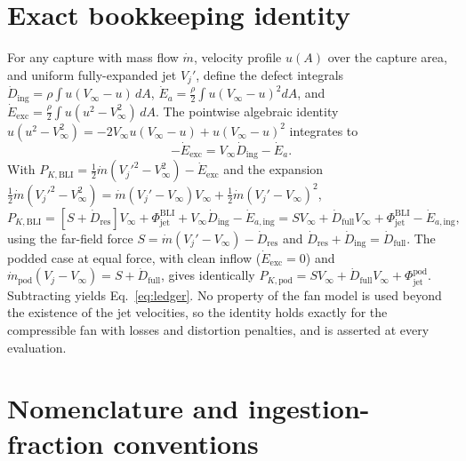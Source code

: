 \documentclass[10pt]{article}
\begin{document}
\appendix

\section{Exact bookkeeping identity}\label{app:identity}

For any capture with mass flow $\dot m$, velocity profile $u(A)$ over the
capture area, and uniform fully-expanded jet $V_j'$, define the defect
integrals
$\dot D_{\mathrm{ing}}=\rho\!\int u(V_\infty-u)\,dA$,
$\dot E_{a}=\tfrac{\rho}{2}\!\int u(V_\infty-u)^2 dA$, and
$\dot E_{\mathrm{exc}}=\tfrac{\rho}{2}\!\int u(u^2-V_\infty^2)\,dA$.
The pointwise algebraic identity
$u(u^2-V_\infty^2) = -2V_\infty u(V_\infty-u) + u(V_\infty-u)^2$
integrates to
\begin{equation}
  -\dot E_{\mathrm{exc}} = V_\infty \dot D_{\mathrm{ing}} - \dot E_{a}.
  \label{eq:defectidentity}
\end{equation}
With $P_{K,\mathrm{BLI}} = \tfrac12\dot m(V_j'^2-V_\infty^2) -
\dot E_{\mathrm{exc}}$ and the expansion $\tfrac12\dot m(V_j'^2-V_\infty^2)
= \dot m(V_j'-V_\infty)V_\infty + \tfrac12\dot m(V_j'-V_\infty)^2$,
\begin{equation}
  P_{K,\mathrm{BLI}} = \left[S + \dot D_{\mathrm{res}}\right]V_\infty
  + \Phi_{\mathrm{jet}}^{\mathrm{BLI}}
  + V_\infty \dot D_{\mathrm{ing}} - \dot E_{a,\mathrm{ing}}
  = S V_\infty + \dot D_{\mathrm{full}} V_\infty
  + \Phi_{\mathrm{jet}}^{\mathrm{BLI}} - \dot E_{a,\mathrm{ing}},
\end{equation}
using the far-field force $S = \dot m(V_j'-V_\infty) - \dot
D_{\mathrm{res}}$ and $\dot D_{\mathrm{res}}+\dot D_{\mathrm{ing}}=\dot
D_{\mathrm{full}}$. The podded case at equal force, with clean inflow
($\dot E_{\mathrm{exc}}=0$) and $\dot m_{\mathrm{pod}}(V_j-V_\infty) = S +
\dot D_{\mathrm{full}}$, gives identically
$P_{K,\mathrm{pod}} = S V_\infty + \dot D_{\mathrm{full}} V_\infty +
\Phi_{\mathrm{jet}}^{\mathrm{pod}}$. Subtracting yields
Eq.~\eqref{eq:ledger}. No property of the fan model is used beyond the
existence of the jet velocities, so the identity holds exactly for the
compressible fan with losses and distortion penalties, and is asserted at
every evaluation.

\section{Nomenclature and ingestion-fraction conventions}\label{app:conventions}
\end{document}
